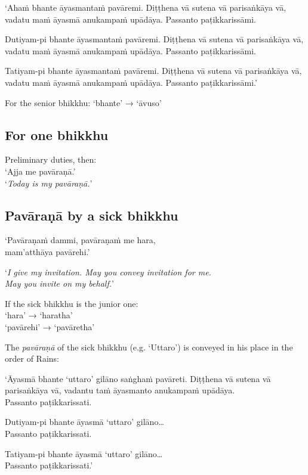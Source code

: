 \begin{paritta}
‘Ahaṁ bhante āyasmantaṁ pavāremi. Diṭṭhena vā sutena vā parisaṅkāya vā, vadatu
maṁ āyasmā anukampaṁ upādāya. Passanto paṭikkarissāmi.

Dutiyam-pi bhante āyasmantaṁ pavāremi. Diṭṭhena vā sutena vā parisaṅkāya vā,
vadatu maṁ āyasmā anukampaṁ upādāya. Passanto paṭikkarissāmi.

Tatiyam-pi bhante āyasmantaṁ pavāremi. Diṭṭhena vā sutena vā parisaṅkāya vā,
vadatu maṁ āyasmā anukampaṁ upādāya. Passanto paṭikkarissāmi.’
\end{paritta}

For the senior bhikkhu: ‘bhante’ → ‘āvuso’ 

\subsection{For one bhikkhu}

Preliminary duties, then:\\
‘Ajja me pavāraṇā.’\\
‘\emph{Today is my pavāraṇā.}’ 

\subsection{Pavāraṇā by a sick bhikkhu}

‘Pavāraṇaṁ dammi, pavāraṇaṁ me hara,\\
mam'atthāya pavārehi.’

‘\emph{I give my invitation. May you convey invitation for me.\\
  May you invite on my behalf.}’ 

If the sick bhikkhu is the junior one:\\
‘hara’ → ‘haratha’\\
‘pavārehi’ → ‘pavāretha’

The \emph{pavāraṇā} of the sick bhikkhu (e.g. ‘Uttaro’) is conveyed in his place
in the order of Rains:

\vspace*{\parskip}

\begin{paritta}
‘Āyasmā bhante ‘uttaro’ gilāno saṅghaṁ pavāreti. Diṭṭhena vā sutena vā
parisaṅkāya vā, vadantu taṁ āyasmanto anukampaṁ upādāya.\\
Passanto paṭikkarissati.

Dutiyam-pi bhante āyasmā ‘uttaro’ gilāno…\\
Passanto paṭikkarissati.

Tatiyam-pi bhante āyasmā ‘uttaro’ gilāno…\\
Passanto paṭikkarissati.’
\end{paritta}

